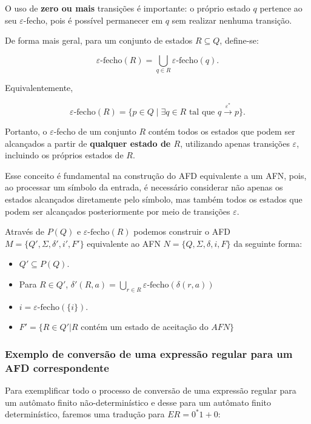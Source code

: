 \documentclass[
  brazilian,
  letterpaper,
]{book}
\theoremstyle{plain}
\theoremstyle{definition}
\theoremstyle{remark}
\begin{document}
O uso de \textbf{zero ou mais} transições é importante: o próprio estado
\(q\) pertence ao seu \(\varepsilon\)-fecho, pois é possível permanecer
em \(q\) sem realizar nenhuma transição.

De forma mais geral, para um conjunto de estados \(R\subseteq Q\),
define-se:

\[
\varepsilon\text{-fecho}(R)
=
\bigcup_{q\in R}\varepsilon\text{-fecho}(q).
\]

Equivalentemente,

\[
\varepsilon\text{-fecho}(R)
=
\{p\in Q\mid
\exists q\in R\text{ tal que }
q\overset{\varepsilon^*}{\longrightarrow}p
\}.
\]

Portanto, o \(\varepsilon\)-fecho de um conjunto \(R\) contém todos os
estados que podem ser alcançados a partir de \textbf{qualquer estado de
\(R\)}, utilizando apenas transições \(\varepsilon\), incluindo os
próprios estados de \(R\).

Esse conceito é fundamental na construção do AFD equivalente a um AFN,
pois, ao processar um símbolo da entrada, é necessário considerar não
apenas os estados alcançados diretamente pelo símbolo, mas também todos
os estados que podem ser alcançados posteriormente por meio de
transições \(\varepsilon\).

Através de \(P(Q)\) e \(\varepsilon\text{-fecho}(R)\) podemos construir
o AFD \(M = \{Q', \Sigma, \delta', i', F'\}\) equivalente ao AFN
\(N = \{Q, \Sigma, \delta, i, F\}\) da seguinte forma:

\begin{itemize}
\item
  \(Q' \subseteq P(Q)\).
\item
  Para \(R \in Q'\),
  \(\delta'(R,a) = \bigcup_{r \in R}\varepsilon\text{-fecho}(\delta(r,a))\)
\item
  \(i = \varepsilon\text{-fecho}(\{i\})\).
\item
  \(F' = \{R \in Q' | R\) contém um estado de aceitação do \(AFN \}\)
\end{itemize}

\subsubsection{Exemplo de conversão de uma expressão regular para um AFD
correspondente}\label{exemplo-de-conversuxe3o-de-uma-expressuxe3o-regular-para-um-afd-correspondente}

Para exemplificar todo o processo de conversão de uma expressão regular
para um autômato finito não-determinístico e desse para um autômato
finito determinístico, faremos uma tradução para \(ER = 0^*1+0\):
\end{document}
